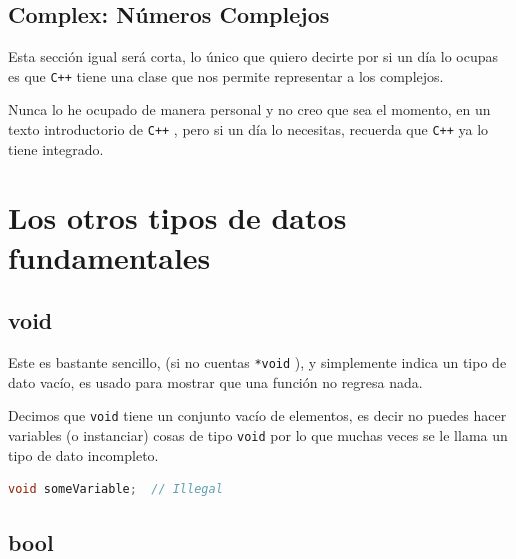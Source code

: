 \documentclass[12pt, fleqn]{report}                             %
\theoremstyle{break}                                            %
\newcommand{\textCode}[1]  { \texttt{#1} }                      %
\newcommand \Cpp  {\textCode{C++} }                               %
\begin{document}
            \subsection{Complex: Números Complejos}

                Esta sección igual será corta, lo único que quiero decirte por si un día lo ocupas
                es que \Cpp tiene una clase que nos permite representar a los complejos.

                Nunca lo he ocupado de manera personal y no creo que sea el momento, en un texto introductorio
                de \Cpp, pero si un día lo necesitas, recuerda que \Cpp ya lo tiene integrado.

            
        \clearpage
        \section{Los otros tipos de datos fundamentales}

            \subsection{void}

                Este es bastante sencillo, (si no cuentas \textCode{*void}), y simplemente indica
                un tipo de dato vacío, es usado para mostrar que una función no regresa nada.
               
                Decimos que \textCode{void} tiene un conjunto vacío de elementos, es decir no puedes hacer
                variables (o instanciar) cosas de tipo  \textCode{void} por lo que muchas veces
                se le llama un tipo de dato incompleto.
                \begin{lstlisting}[language=C++, gobble=20]
                    void someVariable;  // Illegal
                \end{lstlisting}

            \subsection{bool}
\end{document}
